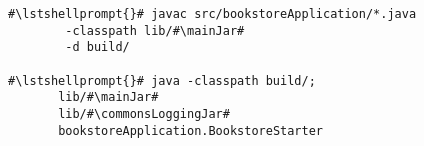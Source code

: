 \begin{lstlisting}[caption=Commands to compile and run the instrumented Bookstore under Windows,label=lst:bookstoreStarterWin]
#\lstshellprompt{}# javac src/bookstoreApplication/*.java
        -classpath lib/#\mainJar#
        -d build/

#\lstshellprompt{}# java -classpath build/;
       lib/#\mainJar#
       lib/#\commonsLoggingJar#
       bookstoreApplication.BookstoreStarter 
\end{lstlisting}
